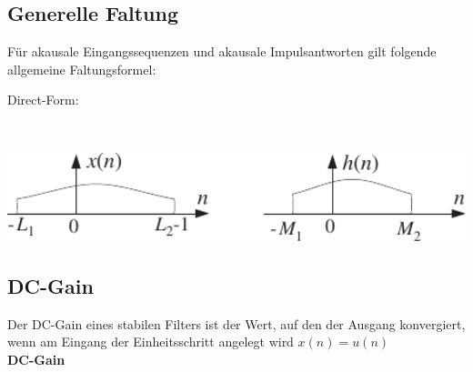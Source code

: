 	\subsection{Generelle Faltung}
		Für akausale Eingangssequenzen und akausale Impulsantworten gilt folgende allgemeine Faltungsformel:\\[0.2cm]
		\begin{minipage}{0.57\textwidth}
			Direct-Form:$\qquad$\\[0.2cm]
		\end{minipage}
		\begin{minipage}{0.03\textwidth}$ $\end{minipage}
		\begin{minipage}{0.4\textwidth}
			\includegraphics[width = 1\textwidth]{pic/genConv.pdf}
		\end{minipage}
		
	\subsection{DC-Gain}
		Der DC-Gain eines stabilen Filters ist der Wert, auf den der Ausgang konvergiert, wenn am Eingang der Einheitsschritt angelegt wird $x(n) = u(n)$\\[0.2cm]
		\textbf{DC-Gain}$\qquad$\\[0.4cm]
		
